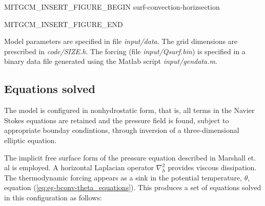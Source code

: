 \begin{rawhtml}MITGCM_INSERT_FIGURE_BEGIN surf-convection-horizsection\end{rawhtml}
\begin{figure}
\begin{center}
\end{center}
\caption{
}
\label{fig:eg-bconv-horizsection}
\label{fig:surf-convection-horizsection}
\end{figure}
\begin{rawhtml}MITGCM_INSERT_FIGURE_END\end{rawhtml}

Model parameters are specified in file {\it input/data}. The grid dimensions are
prescribed in {\it code/SIZE.h}. The forcing (file {\it input/Qsurf.bin}) is specified 
in a binary data file generated using the Matlab script {\it input/gendata.m}.

\subsection{Equations solved}

The model is configured in nonhydrostatic form, that is, all terms in the Navier 
Stokes equations are retained and the pressure field is found, subject to appropriate
bounday condintions, through inversion of a three-dimensional elliptic equation. 

The implicit free surface form of the
pressure equation described in Marshall et. al \cite{marshall:97a} is
employed. A horizontal Laplacian operator $\nabla_{h}^2$ provides viscous
dissipation. The thermodynamic forcing appears as a sink in the potential temperature, 
$\theta$, equation (\ref{eq:eg-bconv-theta_equations}). 
This produces a set of equations solved in this configuration as follows:

